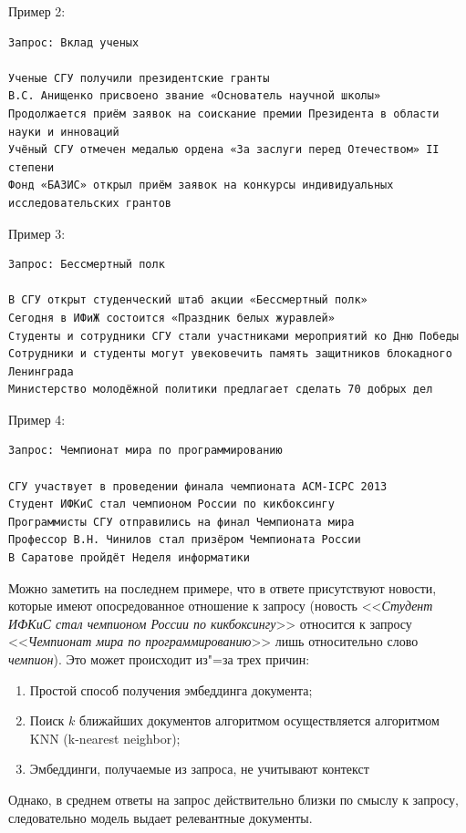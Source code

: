 \documentclass[coursework]{SCWorks}
\begin{document}
Пример 2:
\begin{verbatim}
Запрос: Вклад ученых

Ученые СГУ получили президентские гранты
В.С. Анищенко присвоено звание «Основатель научной школы»
Продолжается приём заявок на соискание премии Президента в области науки и инноваций
Учёный СГУ отмечен медалью ордена «За заслуги перед Отечеством» II степени
Фонд «БАЗИС» открыл приём заявок на конкурсы индивидуальных исследовательских грантов
\end{verbatim}

Пример 3:
\begin{verbatim}
Запрос: Бессмертный полк

В СГУ открыт студенческий штаб акции «Бессмертный полк»
Сегодня в ИФиЖ состоится «Праздник белых журавлей»
Студенты и сотрудники СГУ стали участниками мероприятий ко Дню Победы
Сотрудники и студенты могут увековечить память защитников блокадного Ленинграда
Министерство молодёжной политики предлагает сделать 70 добрых дел
\end{verbatim}

Пример 4:
\begin{verbatim}
Запрос: Чемпионат мира по программированию

СГУ участвует в проведении финала чемпионата ACM-ICPC 2013
Студент ИФКиС стал чемпионом России по кикбоксингу
Программисты СГУ отправились на финал Чемпионата мира
Профессор В.Н. Чинилов стал призёром Чемпионата России
В Саратове пройдёт Неделя информатики
\end{verbatim}

Можно заметить на последнем примере, что в ответе присутствуют новости, которые имеют опосредованное отношение к запросу (новость <<\textit{Студент ИФКиС стал чемпионом России по кикбоксингу}>> относится к запросу <<\textit{Чемпионат мира по программированию}>> лишь относительно слово \textit{чемпион}). Это может происходит из"=за трех причин:
\begin{enumerate}
    \item Простой способ получения эмбеддинга документа;
    \item Поиск $k$ ближайших документов алгоритмом осуществляется алгоритмом KNN (k-nearest neighbor);
    \item Эмбеддинги, получаемые из запроса, не учитывают контекст
\end{enumerate}

Однако, в среднем ответы на запрос действительно близки по смыслу к запросу, следовательно модель выдает релевантные документы. 
\end{document}
